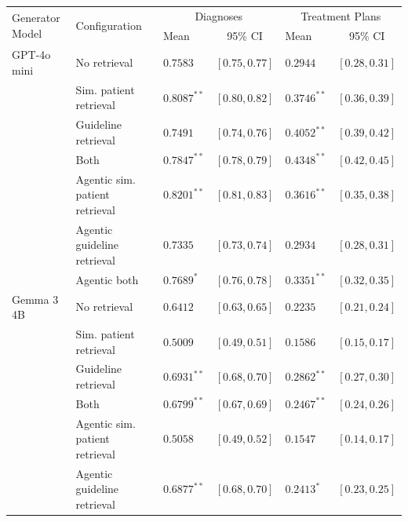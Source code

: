 \begin{table}[!b]
\centering
\small
\setlength{\tabcolsep}{2pt}
\begin{tabular*}{\textwidth}{@{\extracolsep{\fill}}lllclc@{}}
\toprule
\multirow{2}{*}{Generator Model} & \multirow{2}{*}{Configuration} & \multicolumn{2}{c}{Diagnoses} & \multicolumn{2}{c}{Treatment Plans} \\
\cmidrule(lr){3-4}\cmidrule(lr){5-6}
 & & Mean & 95\% CI & Mean & 95\% CI \\
\midrule
GPT-4o mini & No retrieval & $0.7583$ & {\scriptsize $[0.75, 0.77]$} & $0.2944$ & {\scriptsize $[0.28, 0.31]$} \\[2pt]
 & Sim. patient retrieval & $0.8087^{**}$ & {\scriptsize $[0.80, 0.82]$} & $0.3746^{**}$ & {\scriptsize $[0.36, 0.39]$} \\
 & Guideline retrieval & $0.7491$ & {\scriptsize $[0.74, 0.76]$} & $0.4052^{**}$ & {\scriptsize $[0.39, 0.42]$} \\
 & Both & $0.7847^{**}$ & {\scriptsize $[0.78, 0.79]$} & $\mathbf{0.4348}^{**}$ & {\scriptsize $[0.42, 0.45]$} \\
 & Agentic sim. patient retrieval & $\mathbf{0.8201}^{**}$ & {\scriptsize $[0.81, 0.83]$} & $0.3616^{**}$ & {\scriptsize $[0.35, 0.38]$} \\
 & Agentic guideline retrieval & $0.7335$ & {\scriptsize $[0.73, 0.74]$} & $0.2934$ & {\scriptsize $[0.28, 0.31]$} \\
 & Agentic both & $0.7689^{*}$ & {\scriptsize $[0.76, 0.78]$} & $0.3351^{**}$ & {\scriptsize $[0.32, 0.35]$} \\
\midrule
Gemma 3 4B & No retrieval & $0.6412$ & {\scriptsize $[0.63, 0.65]$} & $0.2235$ & {\scriptsize $[0.21, 0.24]$} \\[2pt]
 & Sim. patient retrieval & $0.5009$ & {\scriptsize $[0.49, 0.51]$} & $0.1586$ & {\scriptsize $[0.15, 0.17]$} \\
 & Guideline retrieval & $\mathbf{0.6931}^{**}$ & {\scriptsize $[0.68, 0.70]$} & $\mathbf{0.2862}^{**}$ & {\scriptsize $[0.27, 0.30]$} \\
 & Both & $0.6799^{**}$ & {\scriptsize $[0.67, 0.69]$} & $0.2467^{**}$ & {\scriptsize $[0.24, 0.26]$} \\
 & Agentic sim. patient retrieval & $0.5058$ & {\scriptsize $[0.49, 0.52]$} & $0.1547$ & {\scriptsize $[0.14, 0.17]$} \\
 & Agentic guideline retrieval & $0.6877^{**}$ & {\scriptsize $[0.68, 0.70]$} & $0.2413^{*}$ & {\scriptsize $[0.23, 0.25]$} \\

\end{tabular*}
\end{table}
